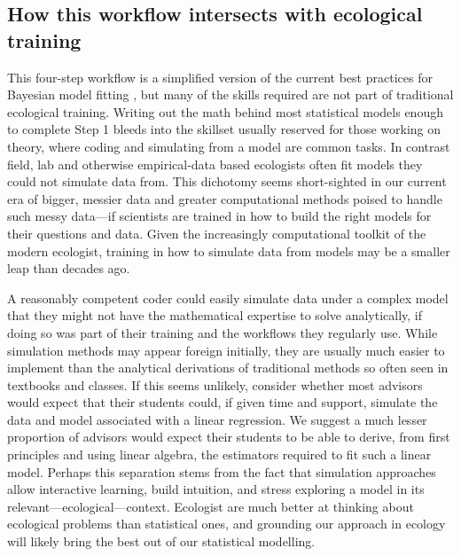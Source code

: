 \documentclass[11pt]{article}
\begin{document}
{\subsection*{How this workflow intersects with ecological training} %

This four-step workflow is a simplified version of the current best practices for Bayesian model fitting  \citep{betanworkflow,vandeschoot2021}, but many of the skills required are not part of traditional ecological training. Writing out the math behind most statistical models enough to complete Step 1 bleeds into the skillset usually reserved for those working on theory, where coding and simulating from a model are common tasks. In contrast field, lab and otherwise empirical-data based ecologists often fit models they could not simulate data from. This dichotomy seems short-sighted in our current era of bigger, messier data and greater computational methods poised to handle such messy data---if scientists are trained in how to build the right models for their questions and data. %
Given the increasingly computational toolkit of the modern ecologist, training in how to simulate data from models may be a smaller leap than decades ago.

A reasonably competent coder could easily simulate data under a complex model that they might not have the mathematical expertise to solve analytically, if doing so was part of their training and the workflows they regularly use. While simulation methods may appear foreign initially, they are usually much easier to implement than the analytical derivations of traditional methods so often seen in textbooks and classes. If this seems unlikely, consider whether most advisors would expect that their students could, if given time and support, simulate the data and model associated with a linear regression. We suggest a much lesser proportion of advisors would expect their students to be able to derive, from first principles and using linear algebra, the estimators required to fit such a linear model. Perhaps this separation stems from the fact that simulation approaches allow interactive learning, build intuition, and stress exploring a model in its relevant---ecological---context. Ecologist are much better at thinking about ecological problems than statistical ones, and grounding our approach in ecology will likely bring the best out of our statistical modelling. %

}
\end{document}
